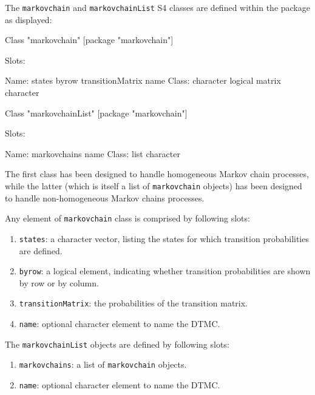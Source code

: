 \documentclass[article,nojss]{jss}
\providecommand{\tightlist}{%
  \setlength{\itemsep}{0pt}\setlength{\parskip}{0pt}}
\begin{document}
The \texttt{markovchain} and \texttt{markovchainList} S4 classes \citep{chambers} are defined within the  package as displayed:

\begin{CodeChunk}

\begin{CodeOutput}
Class "markovchain" [package "markovchain"]

Slots:
                                                                          
Name:            states            byrow transitionMatrix             name
Class:        character          logical           matrix        character
\end{CodeOutput}

\begin{CodeOutput}
Class "markovchainList" [package "markovchain"]

Slots:
                                
Name:  markovchains         name
Class:         list    character
\end{CodeOutput}
\end{CodeChunk}

The first class has been designed to handle homogeneous Markov chain processes, while the latter (which is itself a list of \texttt{markovchain} objects) has been designed to handle non-homogeneous Markov chains processes.

Any element of \texttt{markovchain} class is comprised by following slots:

\begin{enumerate}
\def\labelenumi{\arabic{enumi}.}
\tightlist
\item
  \texttt{states}: a character vector, listing the states for which transition probabilities are defined.
\item
  \texttt{byrow}: a logical element, indicating whether transition probabilities are shown by row or by column.
\item
  \texttt{transitionMatrix}: the probabilities of the transition matrix.
\item
  \texttt{name}: optional character element to name the DTMC.
\end{enumerate}

The \texttt{markovchainList} objects are defined by following slots:

\begin{enumerate}
\def\labelenumi{\arabic{enumi}.}
\tightlist
\item
  \texttt{markovchains}: a list of \texttt{markovchain} objects.
\item
  \texttt{name}: optional character element to name the DTMC.
\end{enumerate}
\end{document}
